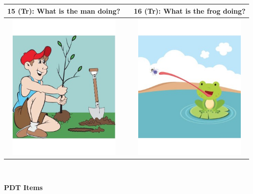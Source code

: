 \begin{tabular}{|c|c|c|}
\hline
15 (Tr): What is the man doing? && 16 (Tr): What is the frog doing? \\
\hline
\includegraphics[width=15em,trim=0 0 0 -3]{figures/I15.jpg} & & \includegraphics[width=15em,trim=0 0 0 -3]{figures/I16.jpg} \\
\hline
\end{tabular}
\vspace{1em} \\


\clearpage

{\large \textbf{PDT Items}}

\vspace{2em}

